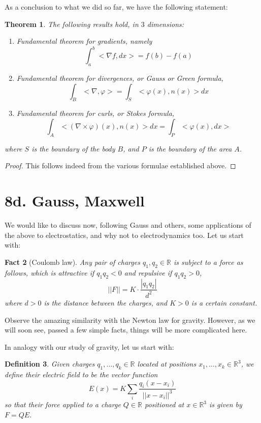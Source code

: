 \documentclass[12pt]{amsbook}
\newtheorem{theorem}{Theorem}[chapter]
\newtheorem{definition}[theorem]{Definition}
\newtheorem{fact}[theorem]{Fact}
\begin{document}
As a conclusion to what we did so far, we have the following statement:

\begin{theorem}
The following results hold, in $3$ dimensions:
\begin{enumerate}
\item Fundamental theorem for gradients, namely
$$\int_a^b<\nabla f,dx>=f(b)-f(a)$$

\item Fundamental theorem for divergences, or Gauss or Green formula,
$$\int_B<\nabla,\varphi>=\int_S<\varphi(x),n(x)>dx$$

\item Fundamental theorem for curls, or Stokes formula,
$$\int_A<(\nabla\times\varphi)(x),n(x)>dx=\int_P<\varphi(x),dx>$$
\end{enumerate}
where $S$ is the boundary of the body $B$, and $P$ is the boundary of the area $A$.
\end{theorem}

\begin{proof}
This follows indeed from the various formulae established above.
\end{proof}

\section*{8d. Gauss, Maxwell}

We would like to discuss now, following Gauss and others, some applications of the above to electrostatics, and why not to electrodynamics too. Let us start with:

\begin{fact}[Coulomb law]
Any pair of charges $q_1,q_2\in\mathbb R$ is subject to a force as follows, which is attractive if $q_1q_2<0$ and repulsive if $q_1q_2>0$,
$$||F||=K\cdot\frac{|q_1q_2|}{d^2}$$
where $d>0$ is the distance between the charges, and $K>0$ is a certain constant.
\end{fact}

Observe the amazing similarity with the Newton law for gravity. However, as we will soon see, passed a few simple facts, things will be more complicated here.

\bigskip

In analogy with our study of gravity, let us start with:

\begin{definition}
Given charges $q_1,\ldots,q_k\in\mathbb R$ located at positions $x_1,\ldots,x_k\in\mathbb R^3$, we define their electric field to be the vector function
$$E(x)=K\sum_i\frac{q_i(x-x_i)}{||x-x_i||^3}$$
so that their force applied to a charge $Q\in\mathbb R$ positioned at $x\in\mathbb R^3$ is given by $F=QE$.
\end{definition}
\end{document}
